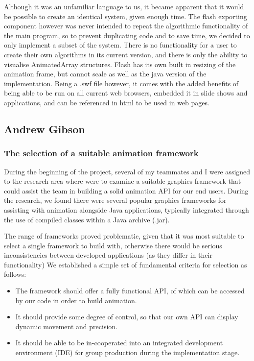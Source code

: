 \documentclass{l3proj}
\begin{document}
\begin{itemize}
Although it was an unfamiliar language to us, it became apparent that it would be possible to create an identical system, given enough time. The flash exporting component however was never intended to repeat the algorithmic functionality of the main program, so to prevent duplicating code and to save time, we decided to only implement a subset of the system. There is no functionality for a user to create their own algorithms in its current version, and there is only the ability to visualise AnimatedArray structures. Flash has its own built in resizing of the animation frame, but cannot scale as well as the java version of the implementation. Being a .swf file however, it comes with the added benefits of being able to be run on all current web browsers, embedded it in slide shows and applications, and can be referenced in html to be used in web pages.
\end{itemize}

\subsection{Andrew Gibson}
\subsubsection{The selection of a suitable animation framework}
\label{frameworkSelection}

During the beginning of the project, several of my teammates and I were assigned to the research area where were to examine a suitable graphics framework that could assist the team in building a solid animation API for our end users. During the research, we found there were several popular graphics frameworks for assisting with animation alongside Java applications, typically integrated through the use of compiled classes within a Java archive (.jar).

The range of frameworks proved problematic, given that it was most suitable to select a single framework to build with, otherwise there would be serious inconsistencies between developed applications (as they differ in their functionality) We established a simple set of fundamental criteria for selection as follows:
\begin{itemize}
	\item The framework should offer a fully functional API, of which can be accessed by our code in order to build animation.
	\item It should provide some degree of control, so that our own API can display dynamic movement and precision.
	\item It should be able to be in-cooperated into an integrated development environment (IDE) for group production during the implementation stage.
\end{itemize}
\end{document}
